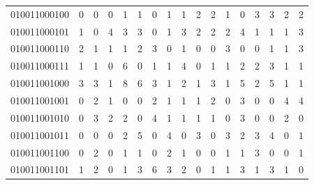 \documentclass[10pt,a4paper]{article}
\begin{document}
\begin{longtable}{ |c|c|c|c|c|c|c|c|c|c|c|c|c|c|c|c|c| }
    010011000100              & 0                            & 0                                & 0                            & 1                              & 1   & 0   & 1   & 1   & 2   & 2   & 1   & 0   & 3   & 3   & 2   & 2   \\
    010011000101              & 1                            & 0                                & 4                            & 3                              & 3   & 0   & 1   & 3   & 2   & 2   & 2   & 4   & 1   & 1   & 1   & 3   \\
    010011000110              & 2                            & 1                                & 1                            & 1                              & 2   & 3   & 0   & 1   & 0   & 0   & 3   & 0   & 0   & 1   & 1   & 3   \\
    010011000111              & 1                            & 1                                & 0                            & 6                              & 0   & 1   & 1   & 4   & 0   & 1   & 1   & 2   & 2   & 3   & 1   & 1   \\
    010011001000              & 3                            & 3                                & 1                            & 8                              & 6   & 3   & 1   & 2   & 1   & 3   & 1   & 5   & 2   & 5   & 1   & 1   \\
    010011001001              & 0                            & 2                                & 1                            & 0                              & 0   & 2   & 1   & 1   & 1   & 2   & 0   & 3   & 0   & 0   & 4   & 4   \\
    010011001010              & 0                            & 3                                & 2                            & 2                              & 0   & 4   & 1   & 1   & 1   & 1   & 0   & 3   & 0   & 0   & 2   & 0   \\
    010011001011              & 0                            & 0                                & 0                            & 2                              & 5   & 0   & 4   & 0   & 3   & 0   & 3   & 2   & 3   & 4   & 0   & 1   \\
    010011001100              & 0                            & 2                                & 0                            & 1                              & 1   & 0   & 2   & 1   & 0   & 0   & 1   & 1   & 3   & 0   & 0   & 1   \\
    010011001101              & 1                            & 2                                & 0                            & 1                              & 3   & 6   & 3   & 2   & 0   & 1   & 1   & 3   & 1   & 3   & 1   & 0   \\

\end{longtable}
\end{document}
